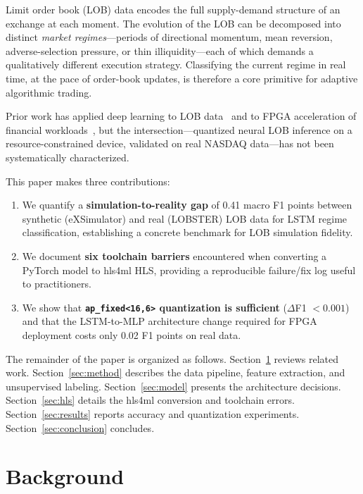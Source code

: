 \documentclass[conference]{IEEEtran}
\begin{document}
Limit order book (LOB) data encodes the full supply-demand structure of an
exchange at each moment. The evolution of the LOB can be decomposed into
distinct \emph{market regimes}—periods of directional momentum, mean reversion,
adverse-selection pressure, or thin illiquidity—each of which demands a
qualitatively different execution strategy. Classifying the current regime in
real time, at the pace of order-book updates, is therefore a core primitive for
adaptive algorithmic trading.

Prior work has applied deep learning to LOB data~\cite{ntakaris2018benchmark,
sirignano2019deep} and to FPGA acceleration of financial
workloads~\cite{eskandari2020fpga}, but the intersection—quantized neural LOB
inference on a resource-constrained device, validated on real NASDAQ data—has
not been systematically characterized.

This paper makes three contributions:
\begin{enumerate}
  \item We quantify a \textbf{simulation-to-reality gap} of 0.41 macro F1 points
        between synthetic (eXSimulator) and real (LOBSTER) LOB data for LSTM
        regime classification, establishing a concrete benchmark for
        LOB simulation fidelity.
  \item We document \textbf{six toolchain barriers} encountered when converting
        a PyTorch model to hls4ml HLS, providing a reproducible failure/fix
        log useful to practitioners.
  \item We show that \textbf{\texttt{ap\_fixed<16,6>} quantization is sufficient}
        ($\Delta$F1 $< 0.001$) and that the LSTM-to-MLP architecture change
        required for FPGA deployment costs only 0.02 F1 points on real data.
\end{enumerate}

The remainder of the paper is organized as follows.
Section~\ref{sec:background} reviews related work.
Section~\ref{sec:method} describes the data pipeline, feature extraction, and
unsupervised labeling.
Section~\ref{sec:model} presents the architecture decisions.
Section~\ref{sec:hls} details the hls4ml conversion and toolchain errors.
Section~\ref{sec:results} reports accuracy and quantization experiments.
Section~\ref{sec:conclusion} concludes.


\section{Background}
\label{sec:background}
\end{document}
